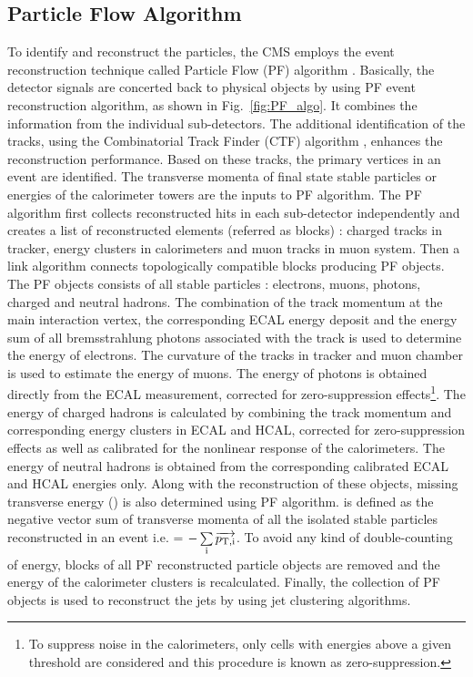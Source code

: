\subsection{Particle Flow Algorithm}
To identify and reconstruct the particles, the CMS employs the event reconstruction technique called Particle Flow (PF) algorithm \cite{CMS:2009nxa, CMS:2010byl}. Basically, the detector signals are concerted back to physical objects by using PF event reconstruction algorithm, as shown in Fig.~\ref{fig:PF_algo}. 
It combines the information from the individual sub-detectors. The additional identification of the tracks, using the Combinatorial Track Finder (CTF) algorithm \cite{Adam:2005cg}, enhances the reconstruction performance. Based on these tracks, the primary vertices in an event are identified. The transverse momenta of final state stable particles or energies of the calorimeter towers are the inputs to PF algorithm. The PF algorithm first collects reconstructed hits in each sub-detector independently and creates a list of reconstructed elements (referred as blocks) : charged tracks in tracker, energy clusters in calorimeters and muon tracks in muon system. Then a link algorithm connects topologically compatible blocks producing PF objects. The PF objects consists of all stable particles : electrons, muons, photons, charged and neutral hadrons. The combination of the track momentum at the main interaction vertex, the corresponding ECAL energy deposit and the energy sum of all bremsstrahlung photons associated with the track is used to determine the energy of electrons. The curvature of the tracks in tracker and muon chamber is used to estimate the energy of muons.  The energy of photons is obtained directly from the ECAL measurement, corrected for zero-suppression effects\footnote{To suppress noise in the calorimeters, only cells with energies above a given threshold are considered and this procedure is known as zero-suppression.}. The energy of charged hadrons is calculated by combining the track momentum and corresponding energy clusters in ECAL and HCAL, corrected for zero-suppression effects as well as calibrated for the nonlinear response of the calorimeters. The energy of neutral hadrons is obtained from the corresponding calibrated ECAL and HCAL energies only. Along with the reconstruction of these objects, missing transverse energy (\ETmiss) is also determined using PF algorithm. \ETmiss is defined as the negative vector sum of transverse momenta \pt of all the isolated stable particles reconstructed in an event i.e. \ETmiss = $-\sum\limits_{\rm i}^{}\overrightarrow{p_{\rm T,i}}$. To avoid any kind of double-counting of energy, blocks of all PF reconstructed particle objects are removed and the energy of the calorimeter clusters is recalculated. Finally, the collection of PF objects is used to reconstruct the jets by using jet clustering algorithms. 

